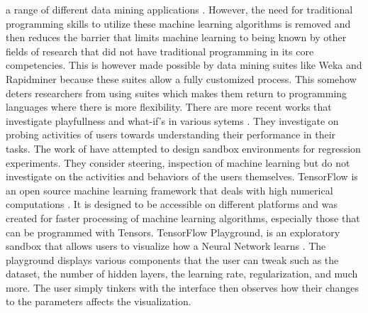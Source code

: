 \documentclass{sigchi}
\begin{document}
a range of different data mining applications \cite{miloˇs2013using}. However, the need for traditional programming skills to utilize these machine learning algorithms is removed and then reduces the barrier that limits machine learning to being known by other fields of research that did not have traditional programming in its core competencies. This is however made possible by data mining suites like Weka and Rapidminer because these suites allow a fully customized process. This somehow deters researchers from using suites which makes them return to programming languages where there is more flexibility. There are more recent works that investigate playfullness and what-if's in various sytems \cite{wexler2019if}. They investigate on probing activities of users towards understanding their performance in their tasks. The work of \cite{das2019beames, zhao2019featureexplorer} have attempted to design sandbox environments for regression experiments. They consider steering, inspection of machine learning but do not investigate on the activities and behaviors of the users themselves. TensorFlow is an open source machine learning framework that deals with high numerical computations \cite{tensorflow_2015}. It is designed to be accessible on different platforms and was created for faster processing of machine learning algorithms, especially those that can be programmed with Tensors. TensorFlow Playground,  is an exploratory sandbox that allows users to visualize how a Neural Network learns \cite{tensorflow_2016}. The playground displays various components that the user can tweak such as the dataset, the number of hidden layers, the learning rate, regularization, and much more. The user simply tinkers with the interface then observes how their changes to the parameters affects the visualization. 
\end{document}
